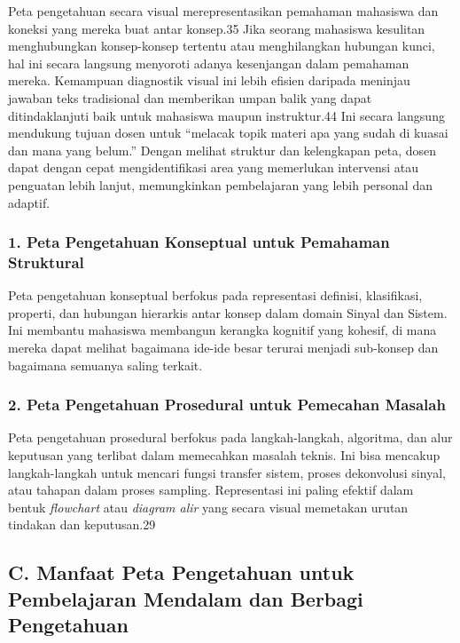 \documentclass[
  letterpaper,
  DIV=11,
  numbers=noendperiod]{scrreprt}
\begin{document}
Peta pengetahuan secara visual merepresentasikan pemahaman mahasiswa dan
koneksi yang mereka buat antar konsep.35 Jika seorang mahasiswa
kesulitan menghubungkan konsep-konsep tertentu atau menghilangkan
hubungan kunci, hal ini secara langsung menyoroti adanya kesenjangan
dalam pemahaman mereka. Kemampuan diagnostik visual ini lebih efisien
daripada meninjau jawaban teks tradisional dan memberikan umpan balik
yang dapat ditindaklanjuti baik untuk mahasiswa maupun instruktur.44 Ini
secara langsung mendukung tujuan dosen untuk ``melacak topik materi apa
yang sudah di kuasai dan mana yang belum.'' Dengan melihat struktur dan
kelengkapan peta, dosen dapat dengan cepat mengidentifikasi area yang
memerlukan intervensi atau penguatan lebih lanjut, memungkinkan
pembelajaran yang lebih personal dan adaptif.

\subsubsection{1. Peta Pengetahuan Konseptual untuk Pemahaman
Struktural}\label{peta-pengetahuan-konseptual-untuk-pemahaman-struktural}

Peta pengetahuan konseptual berfokus pada representasi definisi,
klasifikasi, properti, dan hubungan hierarkis antar konsep dalam domain
Sinyal dan Sistem. Ini membantu mahasiswa membangun kerangka kognitif
yang kohesif, di mana mereka dapat melihat bagaimana ide-ide besar
terurai menjadi sub-konsep dan bagaimana semuanya saling terkait.

\subsubsection{2. Peta Pengetahuan Prosedural untuk Pemecahan
Masalah}\label{peta-pengetahuan-prosedural-untuk-pemecahan-masalah}

Peta pengetahuan prosedural berfokus pada langkah-langkah, algoritma,
dan alur keputusan yang terlibat dalam memecahkan masalah teknis. Ini
bisa mencakup langkah-langkah untuk mencari fungsi transfer sistem,
proses dekonvolusi sinyal, atau tahapan dalam proses sampling.
Representasi ini paling efektif dalam bentuk \emph{flowchart} atau
\emph{diagram alir} yang secara visual memetakan urutan tindakan dan
keputusan.29

\subsection{C. Manfaat Peta Pengetahuan untuk Pembelajaran Mendalam dan
Berbagi
Pengetahuan}\label{c.-manfaat-peta-pengetahuan-untuk-pembelajaran-mendalam-dan-berbagi-pengetahuan}
\end{document}
